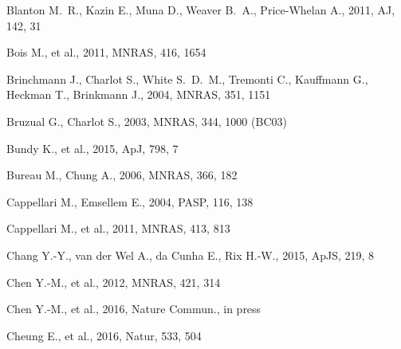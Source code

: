 \documentclass[a4paper,fleqn,usenatbib]{mnras}
\begin{document}
\begin{thebibliography}{}


 Blanton M.~R., Kazin E., Muna D., Weaver B.~A., Price-Whelan A., 2011, AJ, 142, 31 

 Bois M., et al., 2011, MNRAS, 416, 1654 

 Brinchmann J., Charlot S., White S.~D.~M., Tremonti C., Kauffmann G., Heckman T., Brinkmann J., 2004, MNRAS, 351, 1151 

 Bruzual G., Charlot S., 2003, MNRAS, 344, 1000 (BC03)

 Bundy K., et al., 2015, ApJ, 798, 7 

 Bureau M., Chung A., 2006, MNRAS, 366, 182 

 Cappellari M., Emsellem E., 2004, PASP, 116, 138 


 Cappellari M., et al., 2011, MNRAS, 413, 813 

 Chang Y.-Y., van der Wel A., da Cunha E., Rix H.-W., 2015, ApJS, 219, 8 

 Chen Y.-M., et al., 2012, MNRAS, 421, 314 

 Chen Y.-M., et al., 2016, Nature Commun., in press

 Cheung E., et al., 2016, Natur, 533, 504 



\end{thebibliography}
\end{document}
